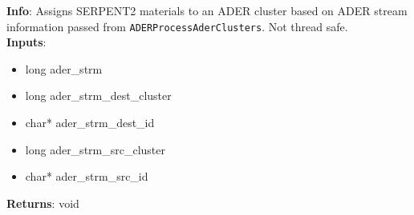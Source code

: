 \textbf{Info}: Assigns SERPENT2 materials to an ADER cluster based on ADER
stream information passed from \texttt{ADERProcessAderClusters}. Not thread
safe. \\

\noindent \textbf{Inputs}:
\begin{itemize}
\item{long ader\_strm}
\item{long ader\_strm\_dest\_cluster}
\item{char* ader\_strm\_dest\_id}
\item{long ader\_strm\_src\_cluster}
\item{char* ader\_strm\_src\_id}
\end{itemize}

\noindent \textbf{Returns}: void
